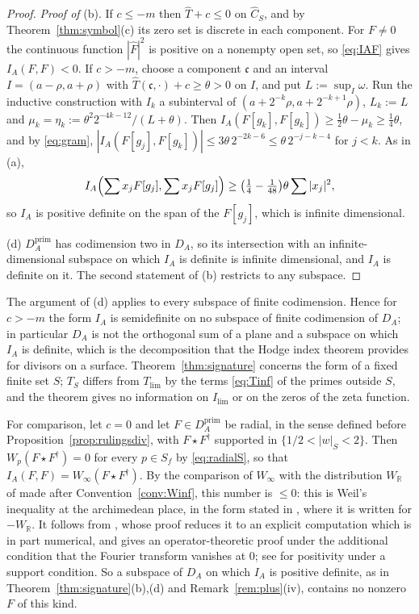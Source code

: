 \documentclass[11pt]{amsart}
\theoremstyle{definition}
\theoremstyle{remark}
\newcommand{\R}{\mathbb R}
\newcommand{\Th}{\widehat{T}}
\newcommand{\Ch}{\widehat{C}_S}
\newcommand{\DA}{D_A}
\begin{document}
\begin{proof}
\emph{Proof of} (b).  If $c\le-m$ then $\Th+c\le0$ on $\Ch$, and by
Theorem~\ref{thm:symbol}(c) its zero set is discrete in each component.  For
$F\ne0$ the continuous function $|\widehat F|^{2}$ is positive on a nonempty
open set, so \eqref{eq:IAF} gives $I_A(F,F)<0$.  If $c>-m$, choose a component
$\mathfrak c$ and an interval $I=(a-\rho,a+\rho)$ with
$\Th(\mathfrak c,\cdot)+c\ge\theta>0$ on $I$, and put $L:=\sup_I\omega$.
Run the inductive construction with $I_k$ a subinterval of
$(a+2^{-k}\rho,a+2^{-k+1}\rho)$, $L_k:=L$ and
$\mu_k=\eta_k:=\theta^{2}2^{-4k-12}/(L+\theta)$.  Then
$I_A(F[g_k],F[g_k])\ge\tfrac12\theta-\mu_k\ge\tfrac14\theta$,
and by \eqref{eq:gram}, $|I_A(F[g_j],F[g_k])|\le3\theta\,2^{-2k-6}\le
\theta\,2^{-j-k-4}$ for $j<k$.  As in (a),
\[
I_A\Bigl(\sum x_jF[g_j],\sum x_jF[g_j]\Bigr)\ge
\bigl(\tfrac14-\tfrac1{48}\bigr)\theta\sum|x_j|^{2},
\]
so $I_A$ is positive definite on the span of the $F[g_j]$, which is
infinite dimensional.

(d)  $\DA^{\mathrm{prim}}$ has codimension two in $\DA$, so its intersection
with an infinite-dimensional subspace on which $I_A$ is definite is
infinite dimensional, and $I_A$ is definite on it.  The second statement of
(b) restricts to any subspace.
\end{proof}

The argument of (d) applies to every subspace of finite codimension.  Hence
for $c>-m$ the form $I_A$ is semidefinite on no subspace of finite codimension
of $\DA$; in particular $\DA$ is not the orthogonal sum of a plane and a
subspace on which $I_A$ is definite, which is the decomposition that the Hodge
index theorem provides for divisors on a surface.
Theorem~\ref{thm:signature} concerns the form of a fixed finite set $S$;
$T_S$ differs from $T_{\lim}$ by the terms \eqref{eq:Tinf} of the primes
outside $S$, and the theorem gives no information on $I_{\lim}$ or on the
zeros of the zeta function.

For comparison, let $c=0$ and let $F\in\DA^{\mathrm{prim}}$ be radial, in the
sense defined before Proposition~\ref{prop:rulingsdiv}, with
$F\star F^{\dagger}$ supported in $\{1/2<|w|_S<2\}$.  Then
$W_p(F\star F^{\dagger})=0$ for every $p\in S_f$ by \eqref{eq:radialS}, so
that $I_A(F,F)=W_{\infty}(F\star F^{\dagger})$.  By the comparison of
$W_{\infty}$ with the distribution $W_{\R}$ of \cite{CCWeilArch} made after
Convention~\ref{conv:Winf}, this number is $\le0$: this is Weil's inequality
at the archimedean place, in the form stated in
\cite[Introduction]{CCWeilArch}, where it is written for $-W_{\R}$.  It
follows from \cite[Theorem~1]{Yoshida}, whose proof reduces it to an explicit
computation which is in part numerical, and \cite[Theorem~1]{CCWeilArch}
gives an operator-theoretic proof under the additional condition that the
Fourier transform vanishes at $0$; see \cite{Bombieri,BurnolCR} for positivity under a
support condition.  So a subspace of $\DA$ on which $I_A$
is positive definite, as in Theorem~\ref{thm:signature}(b),(d) and
Remark~\ref{rem:plus}(iv), contains no nonzero $F$ of this kind.
\end{document}
